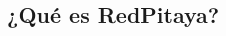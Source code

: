 \documentclass{beamer}
\begin{document}
\begin{frame}
\begin{columns}
\begin{column}{0.5\textwidth}
\begin{center}
\end{center}
\end{column}
\end{columns}
\end{frame}  

\subsection{¿Qué es RedPitaya?}
\end{document}
